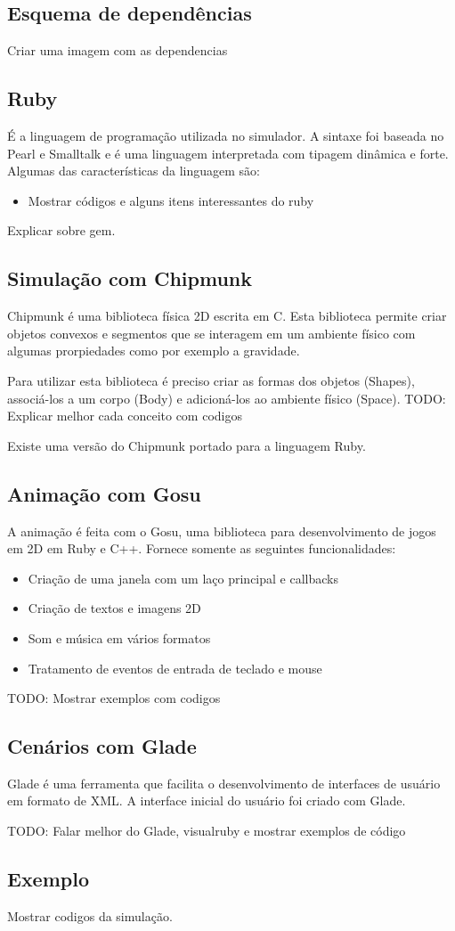 \subsection{Esquema de dependências}
Criar uma imagem com as dependencias


\subsection{Ruby}
É a linguagem de programação utilizada no simulador. A sintaxe foi baseada no Pearl e Smalltalk e é uma linguagem interpretada com tipagem dinâmica e forte.
Algumas das características da linguagem são:
\begin{itemize}
  \item Mostrar códigos e alguns itens interessantes do ruby
\end{itemize}

Explicar sobre gem.

\subsection{Simulação com Chipmunk}
Chipmunk é uma biblioteca física 2D escrita em C. Esta biblioteca permite criar objetos convexos e segmentos que se interagem em um ambiente físico com algumas prorpiedades 
como por exemplo a gravidade.

Para utilizar esta biblioteca é preciso criar as formas dos objetos (Shapes), associá-los a um corpo (Body) e adicioná-los ao ambiente físico (Space).
TODO: Explicar melhor cada conceito com codigos

Existe uma versão do Chipmunk portado para a linguagem Ruby.
\subsection{Animação com Gosu}
A animação é feita com o Gosu, uma biblioteca para desenvolvimento de jogos em 2D em Ruby e C++. Fornece somente as seguintes funcionalidades:
\begin{itemize}
  \item Criação de uma janela com um laço principal e callbacks
  \item Criação de textos e imagens 2D
  \item Som e música em vários formatos
  \item Tratamento de eventos de entrada de teclado e mouse
\end{itemize}

TODO: Mostrar exemplos com codigos
\subsection{Cenários com Glade}
Glade é uma ferramenta que facilita o desenvolvimento de interfaces de usuário em formato de XML. A interface inicial do usuário foi criado com Glade.

TODO: Falar melhor do Glade, visualruby e mostrar exemplos de código
\subsection{Exemplo}

Mostrar codigos da simulação.
